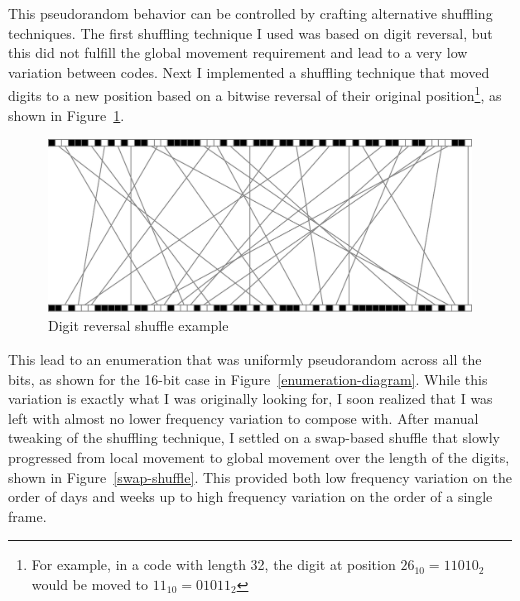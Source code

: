 \documentclass{thesis}
\begin{document}
This pseudorandom behavior can be controlled by crafting alternative shuffling techniques. The first shuffling technique I used was based on digit reversal, but this did not fulfill the global movement requirement and lead to a very low variation between codes. Next I implemented a shuffling technique that moved digits to a new position based on a bitwise reversal of their original position\footnote{For example, in a code with length 32, the digit at position $26_{10}=11010_2$ would be moved to $11_{10}=01011_2$}, as shown in Figure~\ref{reversal-shuffle}.

\begin{figure}
	\begin{center}
		\includegraphics[scale=.5]{graphics/reversal-shuffle.pdf}
		\caption{Digit reversal shuffle example}
		\label{reversal-shuffle}
	\end{center}
\end{figure}

This lead to an enumeration that was uniformly pseudorandom across all the bits, as shown for the 16-bit case in Figure~\ref{enumeration-diagram}. While this variation is exactly what I was originally looking for, I soon realized that I was left with almost no lower frequency variation to compose with. After manual tweaking of the shuffling technique, I settled on a swap-based shuffle that slowly progressed from local movement to global movement over the length of the digits, shown in Figure~\ref{swap-shuffle}. This provided both low frequency variation on the order of days and weeks up to high frequency variation on the order of a single frame.
\end{document}
